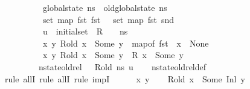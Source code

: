 \begin{isabellebody}
\ \ \ \ \ \ \ \ \ \ {\isachardoublequoteopen}global{\isacharunderscore}{\kern0pt}state\ ns\ {\isacharequal}{\kern0pt}\ old{\isacharunderscore}{\kern0pt}global{\isacharunderscore}{\kern0pt}state\ ns{\isachardoublequoteclose}\ \isanewline
\ \ \ \ \ \ \ \ \ \ {\isachardoublequoteopen}set\ {\isacharparenleft}{\kern0pt}map\ fst\ {\isacharparenleft}{\kern0pt}fst\ {\isasymLambda}{}{\isacharparenright}{\kern0pt}{\isacharparenright}{\kern0pt}\ {\isasyminter}\ set\ {\isacharparenleft}{\kern0pt}map\ fst\ {\isacharparenleft}{\kern0pt}snd\ {\isasymLambda}{}{\isacharparenright}{\kern0pt}{\isacharparenright}{\kern0pt}\ {\isacharequal}{\kern0pt}\ {\isacharbraceleft}{\kern0pt}{\isacharbraceright}{\kern0pt}{\isachardoublequoteclose}\isanewline
\ \ \ \ \ \ \ \ \ \ {\isachardoublequoteopen}u\ {\isasymin}\ initial{\isacharunderscore}{\kern0pt}set\ \ R\ {\isasymLambda}{}\ {\isasymLambda}{}\ {\isacharbrackleft}{\kern0pt}{\isacharbrackright}{\kern0pt}\ ns{\isachardoublequoteclose}\ \isanewline
\ \ \ \ \ \ \ \ \ \ {\isachardoublequoteopen}{\isasymAnd}x\ y{\isachardot}{\kern0pt}\ R{\isacharunderscore}{\kern0pt}old\ x\ {\isacharequal}{\kern0pt}\ Some\ y\ {\isasymlongrightarrow}\ map{\isacharunderscore}{\kern0pt}of\ {\isacharparenleft}{\kern0pt}fst\ {\isasymLambda}{}{\isacharparenright}{\kern0pt}\ x\ {\isasymnoteq}\ None{\isachardoublequoteclose}\ \isanewline
\ \ \ \ \ \ \ \ \ \ {\isachardoublequoteopen}{\isasymAnd}x\ y{\isachardot}{\kern0pt}\ R{\isacharunderscore}{\kern0pt}old\ x\ {\isacharequal}{\kern0pt}\ Some\ y\ {\isasymlongrightarrow}\ R\ x\ {\isacharequal}{\kern0pt}\ Some\ y{\isachardoublequoteclose}\isanewline
\ \ \ \ \ \ \ \ \ {\isachardoublequoteopen}nstate{\isacharunderscore}{\kern0pt}old{\isacharunderscore}{\kern0pt}rel\ {\isasymLambda}{}\ {\isasymLambda}{}\ R{\isacharunderscore}{\kern0pt}old\ ns\ u{\isachardoublequoteclose}\isanewline
%
\isadelimproof
\ \ %
\endisadelimproof
%
\isatagproof
{}\isamarkupfalse%
\ nstate{\isacharunderscore}{\kern0pt}old{\isacharunderscore}{\kern0pt}rel{\isacharunderscore}{\kern0pt}def\isanewline
{}\isamarkupfalse%
\ {\isacharparenleft}{\kern0pt}rule\ allI{\isacharcomma}{\kern0pt}\ rule\ allI{\isacharcomma}{\kern0pt}\ rule\ impI{\isacharparenright}{\kern0pt}\ \ \isanewline
\ \ \isamarkupfalse%
\ x\ y\isanewline
\ \ \isamarkupfalse%
\ {\isachardoublequoteopen}R{\isacharunderscore}{\kern0pt}old\ x\ {\isacharequal}{\kern0pt}\ Some\ {\isacharparenleft}{\kern0pt}Inl\ y{\isacharparenright}{\kern0pt}{\isachardoublequoteclose}\isanewline

\end{isabellebody}
